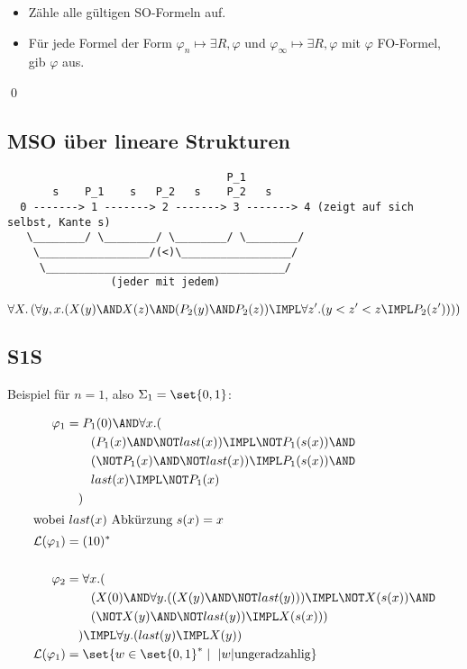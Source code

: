 \begin{itemize}
  \item Zähle alle gültigen SO-Formeln auf.
  \item Für jede Formel der Form $\varphi_n\mapsto\exists R,\varphi$ und
  $\varphi_\infty\mapsto\exists R,\varphi$ mit $\varphi$ FO-Formel, gib
  $\varphi$ aus.
\end{itemize}
\qed

\subsection{MSO über lineare Strukturen}

\begin{verbatim}
                                  P_1
       s    P_1    s   P_2   s    P_2   s
  0 -------> 1 -------> 2 -------> 3 -------> 4 (zeigt auf sich selbst, Kante s)
   \________/ \________/ \________/ \________/
    \_________________/(<)\_________________/
     \_____________________________________/
                (jeder mit jedem)
\end{verbatim}

\[
  \forall X.\left(\forall y,x. (X(y) \AND X(z) \AND (P_2(y) \AND P_2(z)) \IMPL
    \forall z'.(y<z'<z \IMPL P_2(z'))) \right)
\]

\subsection{S1S}

Beispiel für $n=1$, also $\Sigma_1=\set{0,1}$:

\begin{align*}
  \varphi_1 &= P_1(0) \AND \forall x.(\\
    &\qquad (P_1(x) \AND \NOT last(x)) \IMPL \NOT P_1(s(x)) \AND\\
    &\qquad (\NOT P_1(x) \AND \NOT last(x)) \IMPL P_1(s(x)) \AND\\
    &\qquad last(x) \IMPL \NOT P_1(x)\\
  &\quad)\\
  \intertext{wobei $last(x)$ Abkürzung $s(x)=x$}
  \mathcal{L}(\varphi_1) &= (10)^*\\[\baselineskip]
  \varphi_2 &= \forall x.(\\
    &\qquad (X(0) \AND \forall y.((X(y) \AND \NOT last(y)))\IMPL \NOT X(s(x)) \AND\\
    &\qquad (\NOT X(y) \AND \NOT last(y)) \IMPL X(s(x)))\\
  &\quad) \IMPL \forall y.(last(y)\IMPL X(y)) \\
  \mathcal{L}(\varphi_1) &= \set{w\in\set{0,1}^*\mid~|w| \text{ungeradzahlig}}
\end{align*}

